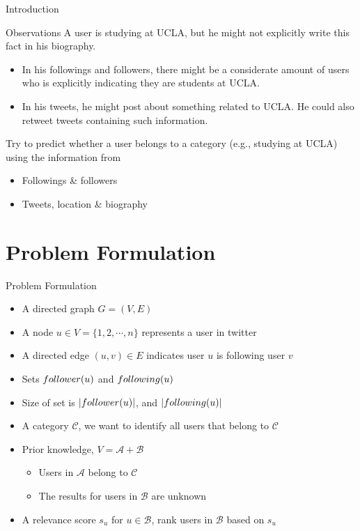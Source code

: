 \documentclass{beamer}
\begin{document}
\begin{frame}{Introduction}
\begin{block}{Observations}
A user is studying at UCLA, but he might not explicitly write this fact in his biography.
\begin{itemize}
\item In his followings and followers, there might be a considerate amount of users who is explicitly indicating they are students at UCLA.
\item In his tweets, he might post about something related to UCLA. He could also retweet tweets containing such information.
\end{itemize}
\end{block}
\pause
Try to predict whether a user belongs to a category (e.g., studying at UCLA) using the information from
\begin{itemize}
\item Followings \& followers
\item Tweets, location \& biography
\end{itemize}
\end{frame}

\section{Problem Formulation}
\begin{frame}{Problem Formulation}
\begin{itemize}
\item A directed graph $G = (V,E)$
\item A node $u \in V = \{1, 2, \cdots, n\}$ represents a user in twitter
\item A directed edge $(u,v) \in E$ indicates user $u$ is following user $v$
\item Sets $follower(u)$ and $following(u)$
\item Size of set is $|follower(u)|$, and $|following(u)|$
\end{itemize}
\pause

\begin{itemize}
\item A category $\mathcal{C}$, we want to identify all users that belong to $\mathcal{C}$
\item Prior knowledge, $V = \mathcal{A} + \mathcal{B}$
\begin{itemize}
\item Users in $\mathcal{A}$ belong to $\mathcal{C}$
\item The results for users in $\mathcal{B}$ are unknown
\end{itemize}
\item A relevance score $s_u$ for $u \in \mathcal{B}$, rank users in $\mathcal{B}$ based on $s_u$
\end{itemize}
\end{frame}
\end{document}
